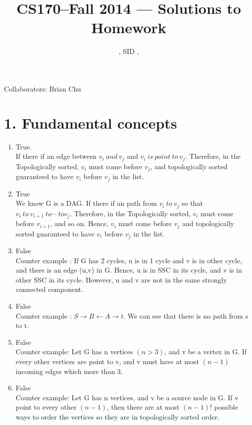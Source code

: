 \documentclass[11pt]{article}
\title{CS170--Fall 2014 --- Solutions to Homework \Homework}
\author{\Name, SID \SID, \texttt{\Login}}
\newenvironment{qparts}{\begin{enumerate}[{(}a{)}]}{\end{enumerate}}
\begin{document}
\maketitle

\noindent
Collaborators: Brian Chu

\section*{1. Fundamental concepts}
\begin{qparts}
\item
True.\\
If there if an edge between $v_i\ and\ v_j$ and $v_i\ is\ point\ to\ v_j$. Therefore, in the Topologically sorted, $v_i$ must come before $v_j$, and topologically sorted guaranteed to have $v_i$ before $v_j$ in the list.
\item
True\\
We know G is a DAG. If there if an path from $v_i\ to\ v_j$ so that $v_i\ to\ v_{i+1}\ to \cdots\ to  v_j$. Therefore, in the Topologically sorted, $v_i$ must come before $v_{i+1}$, and so on. Hence, $v_i$ must come before  $v_j$ and topologically sorted guaranteed to have $v_i$ before $v_j$ in the list.
\item
False\\
Counter example : If G has 2 cycles, u is in 1 cycle and v is in other cycle, and there is an edge (u,v) in G. Hence, u is in SSC in its cycle, and v is in other SSC in its cycle. However, u and v are not in the same strongly connected component.
\item
False\\
Counter example : $S\to B\longleftarrow A\longrightarrow t$. We can see that there is no path from s to t.

\item
False\\
Counter example: Let G has n vertices $(n>3)$, and v be a vertex in G. If every other vertices are point to v, and v must have at most $(n-1)$ incoming edges which more than 3.
\item
False\\
Counter example: Let G has n vertices, and v be a source node in G. If v point to every other $(n-1)$, then there are at most $(n-1)!$ possible ways to order the vertices so they are in topologically sorted order.


\end{qparts}
\end{document}
